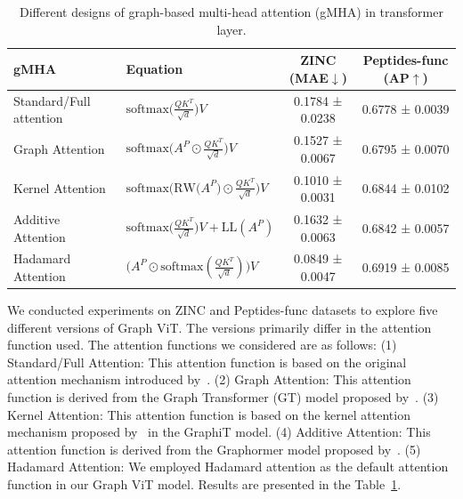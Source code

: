 \documentclass{article}
\begin{document}
\begin{table}[!ht]
    \centering
    \caption{Different designs of graph-based multi-head attention (gMHA) in transformer layer.}
    \label{tab: graph vit}
    \small
    \begin{tabular}{llcc}
    \toprule
         gMHA &  Equation & ZINC (MAE$\downarrow$)& Peptides-func (AP$\uparrow$) \\
         \midrule
         Standard/Full attention~\citep{vaswani2017attention}
         & $\textrm{softmax}\big(\frac{QK^T}{\sqrt{d}}\big)V$
         & 0.1784 ± 0.0238
         & 0.6778 ± 0.0039 \\
        Graph Attention~\citep{dwivedi2021generalization}
        & $\textrm{softmax}\big(A^P\odot \frac{QK^T}{\sqrt{d}}\big)V$
        & 0.1527 ± 0.0067
        & 0.6795 ± 0.0070  \\
        Kernel Attention~\citep{mialon2021graphit}
        & $\textrm{softmax}\big(\textrm{RW(}A^P)\odot \frac{QK^T}{\sqrt{d}}\big)V$
        & 0.1010 ± 0.0031
        & 0.6844 ± 0.0102 \\
        Additive Attention~\citep{ying2021graphormer}
        & $\textrm{softmax}\big(\frac{QK^T}{\sqrt{d}}\big)V+\textrm{LL}(A^P)$
        & 0.1632 ± 0.0063
        & 0.6842 ± 0.0057\\
        Hadamard Attention
        & $\big(A^P\odot\textrm{softmax}(\frac{QK^T}{\sqrt{d}})\big)V$ 
        & 0.0849 ± 0.0047
        & 0.6919 ± 0.0085 \\
        \bottomrule
    \end{tabular}
\end{table}

We conducted experiments on ZINC and Peptides-func datasets to explore five different versions of Graph ViT. The versions primarily differ in the attention function used. The attention functions we considered are as follows:
(1) Standard/Full Attention: This attention function is based on the original attention mechanism introduced by~\citet{vaswani2017attention}.
(2) Graph Attention: This attention function is derived from the Graph Transformer (GT) model proposed by~\citet{dwivedi2021generalization}.
(3) Kernel Attention: This attention function is based on the kernel attention mechanism proposed by~\citet{mialon2021graphit} in the GraphiT model.
(4) Additive Attention: This attention function is derived from the Graphormer model proposed by~\citet{ying2021graphormer}.
(5) Hadamard Attention: We employed Hadamard attention as the default attention function in our Graph ViT model. 
Results are presented in the Table~\ref{tab: graph vit}. 
\end{document}
